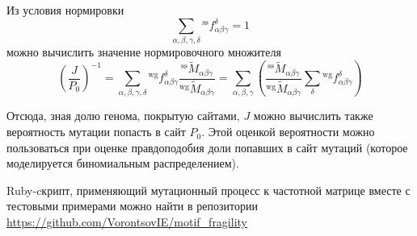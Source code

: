 \documentclass[a4paper]{article}
\begin{document}
Из условия нормировки
$$\sum_{\alpha,\beta,\gamma,\delta}{}^{\textrm{ss}}f_{\alpha\beta\gamma}^{\delta} = 1$$ можно вычислить значение нормировочного множителя
$$\left(\frac{J}{P_0}\right)^{-1} = \sum_{\alpha,\beta,\gamma,\delta}{}^{\textrm{wg}}f_{\alpha\beta\gamma}^{\delta} \frac{{}^{\textrm{ss}}\widetilde{M}_{\alpha\beta\gamma}}{{}^{\textrm{wg}}\widetilde{M}_{\alpha\beta\gamma}} = \sum_{\alpha,\beta,\gamma}\left(\frac{{}^{\textrm{ss}}\widetilde{M}_{\alpha\beta\gamma}}{{}^{\textrm{wg}}\widetilde{M}_{\alpha\beta\gamma}}\sum_{\delta}{}^{\textrm{wg}}f_{\alpha\beta\gamma}^{\delta}\right)$$

Отсюда, зная долю генома, покрытую сайтами, $J$ можно вычислить также вероятность мутации попасть в сайт $P_0$. Этой оценкой вероятности можно пользоваться при оценке правдоподобия доли попавших в сайт мутаций (которое моделируется биномиальным распределением).

Ruby-cкрипт, применяющий мутационный процесс к частотной матрице вместе с тестовыми примерами можно найти в репозитории \url{https://github.com/VorontsovIE/motif_fragility}
\end{document}

